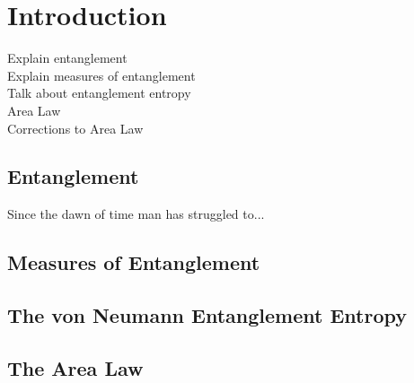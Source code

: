 \chapter{Introduction}



Explain entanglement\\
Explain measures of entanglement\\
Talk about entanglement entropy\\
Area Law\\
Corrections to Area Law\\

\section{Entanglement}

Since the dawn of time man has struggled to...


\section{Measures of Entanglement}
\section{The von Neumann Entanglement Entropy}
\section{The Area Law}

